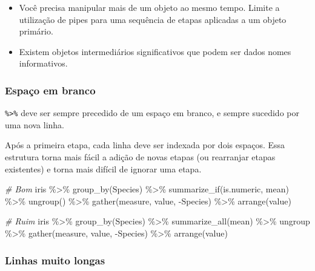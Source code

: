\documentclass[
]{book}
\newenvironment{Shaded}{\begin{snugshade}}{\end{snugshade}}
\newcommand{\CommentTok}[1]{\textcolor[rgb]{0.56,0.35,0.01}{\textit{#1}}}
\newcommand{\FunctionTok}[1]{\textcolor[rgb]{0.00,0.00,0.00}{#1}}
\newcommand{\NormalTok}[1]{#1}
\newcommand{\SpecialCharTok}[1]{\textcolor[rgb]{0.00,0.00,0.00}{#1}}
\begin{document}
\begin{itemize}
\item
  Você precisa manipular mais de um objeto ao mesmo tempo. Limite a utilização de pipes para uma sequência de etapas aplicadas a um objeto primário.
\item
  Existem objetos intermediários significativos que podem ser dados nomes informativos.
\end{itemize}

\hypertarget{espauxe7o-em-branco}{%
\subsubsection{Espaço em branco}\label{espauxe7o-em-branco}}

\texttt{\%\textgreater{}\%} deve ser sempre precedido de um espaço em branco, e sempre sucedido por uma nova linha.

Após a primeira etapa, cada linha deve ser indexada por dois espaços. Essa estrutura torna mais fácil a adição de novas etapas (ou rearranjar etapas existentes) e torna mais difícil de ignorar uma etapa.

\begin{Shaded}
\begin{Highlighting}[]
\CommentTok{\# Bom}
\NormalTok{iris }\SpecialCharTok{\%\textgreater{}\%}
  \FunctionTok{group\_by}\NormalTok{(Species) }\SpecialCharTok{\%\textgreater{}\%}
  \FunctionTok{summarize\_if}\NormalTok{(is.numeric, mean) }\SpecialCharTok{\%\textgreater{}\%}
  \FunctionTok{ungroup}\NormalTok{() }\SpecialCharTok{\%\textgreater{}\%}
  \FunctionTok{gather}\NormalTok{(measure, value, }\SpecialCharTok{{-}}\NormalTok{Species) }\SpecialCharTok{\%\textgreater{}\%}
  \FunctionTok{arrange}\NormalTok{(value)}

\CommentTok{\# Ruim}
\NormalTok{iris }\SpecialCharTok{\%\textgreater{}\%} \FunctionTok{group\_by}\NormalTok{(Species) }\SpecialCharTok{\%\textgreater{}\%} \FunctionTok{summarize\_all}\NormalTok{(mean) }\SpecialCharTok{\%\textgreater{}\%}
\NormalTok{ungroup }\SpecialCharTok{\%\textgreater{}\%} \FunctionTok{gather}\NormalTok{(measure, value, }\SpecialCharTok{{-}}\NormalTok{Species) }\SpecialCharTok{\%\textgreater{}\%}
\FunctionTok{arrange}\NormalTok{(value)}
\end{Highlighting}
\end{Shaded}

\hypertarget{linhas-muito-longas}{%
\subsubsection{Linhas muito longas}\label{linhas-muito-longas}}
\end{document}
